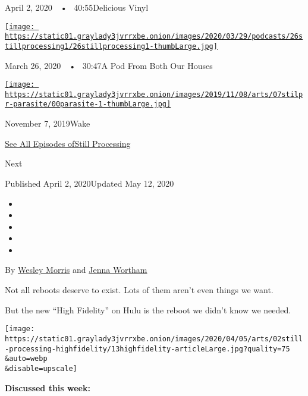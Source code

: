 April 2, 2020~~•~ 40:55Delicious Vinyl

\href{https://www.nytimes3xbfgragh.onion/2020/03/26/podcasts/still-processing-quarantine.html?action=click\&module=audio-series-bar\&region=header\&pgtype=Article}{\texttt{[image: https://static01.graylady3jvrrxbe.onion/images/2020/03/29/podcasts/26stillprocessing1/26stillprocessing1-thumbLarge.jpg]}}

March 26, 2020~~•~ 30:47A Pod From Both Our Houses

\href{https://www.nytimes3xbfgragh.onion/2019/11/07/podcasts/still-processing-parasite-watchmen-bong-joon-ho.html?action=click\&module=audio-series-bar\&region=header\&pgtype=Article}{\texttt{[image: https://static01.graylady3jvrrxbe.onion/images/2019/11/08/arts/07stilpr-parasite/00parasite-1-thumbLarge.jpg]}}

November 7, 2019Wake

\href{https://www.nytimes3xbfgragh.onion/column/still-processing-podcast}{See
All Episodes ofStill Processing}

Next

Published April 2, 2020Updated May 12, 2020

\begin{itemize}
\item
\item
\item
\item
\item
\end{itemize}

By \href{https://www.nytimes3xbfgragh.onion/by/wesley-morris}{Wesley
Morris} and
\href{https://www.nytimes3xbfgragh.onion/by/jenna-wortham}{Jenna
Wortham}

Not all reboots deserve to exist. Lots of them aren't even things we
want.

But the new ``High Fidelity'' on Hulu is the reboot we didn't know we
needed.

\texttt{[image: https://static01.graylady3jvrrxbe.onion/images/2020/04/05/arts/02still-processing-highfidelity/13highfidelity-articleLarge.jpg?quality=75\\\&auto=webp\\\&disable=upscale]}

\textbf{Discussed this week:}

